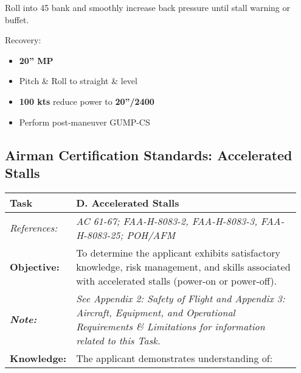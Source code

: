 Roll into 45\degree{} bank and smoothly increase back pressure until stall warning or buffet.

Recovery:
\begin{itemize}[label={}]
\item \textbf{20'' MP}
\item Pitch \& Roll to straight \& level
\item \textbf{100 kts} reduce power to \textbf{20''/2400}
\item Perform post-maneuver GUMP-CS
\end{itemize}
\newpage
\subsection{Airman Certification Standards: Accelerated Stalls}

\begin{table}[H]
\begin{tabular}%
  {>{\raggedleft\arraybackslash}p{0.15\linewidth}%
   >{\raggedright\arraybackslash}p{0.8\linewidth}%
  }
\textbf{Task}                                                       & \textbf{D. Accelerated Stalls}                                                                                                                                                                                                                           \\ \hline
\textit{References:}                                                & \textit{AC 61-67; FAA-H-8083-2, FAA-H-8083-3, FAA-H-8083-25; POH/AFM}                                                                                                                                                                                    \\
\textbf{Objective:}                                                 & To determine the applicant exhibits satisfactory knowledge, risk management, and skills associated with accelerated stalls (power-on or power-off).                                                                                                      \\
\textit{\textbf{Note:}}                                             & \textit{See Appendix 2: Safety of Flight and Appendix 3: Aircraft, Equipment, and Operational Requirements \& Limitations for information related to this Task.}                                                                                         \\ \hline
\textbf{Knowledge:}                                                 & The applicant demonstrates understanding of:                                                                                                                                                                                                             \\

\end{tabular}
\end{table}
